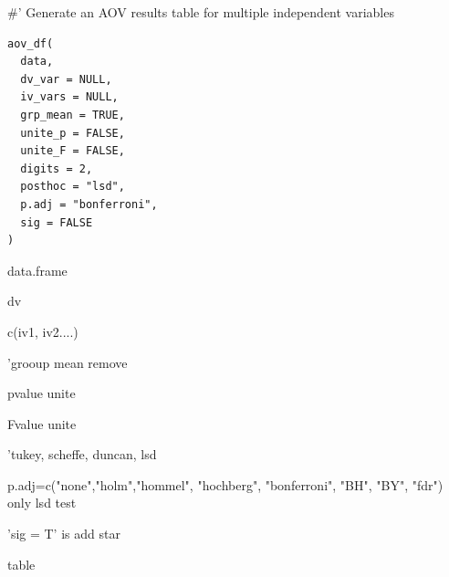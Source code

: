 \documentclass[a4paper]{book}
\begin{document}
%
\begin{Description}
\#' Generate an AOV results table for multiple independent variables
\end{Description}
%
\begin{Usage}
\begin{verbatim}
aov_df(
  data,
  dv_var = NULL,
  iv_vars = NULL,
  grp_mean = TRUE,
  unite_p = FALSE,
  unite_F = FALSE,
  digits = 2,
  posthoc = "lsd",
  p.adj = "bonferroni",
  sig = FALSE
)
\end{verbatim}
\end{Usage}
%
\begin{Arguments}
\begin{ldescription}
\item[\code{data}] data.frame

\item[\code{dv\_var}] dv

\item[\code{iv\_vars}] c(iv1, iv2....)

\item[\code{grp\_mean}] 'grooup mean remove

\item[\code{unite\_p}] pvalue unite

\item[\code{unite\_F}] Fvalue unite

\item[\code{posthoc}] 'tukey, scheffe, duncan, lsd

\item[\code{p.adj}] p.adj=c("none","holm","hommel", "hochberg", "bonferroni", "BH", "BY", "fdr") only lsd test

\item[\code{sig}] 'sig = T' is add star
\end{ldescription}
\end{Arguments}
%
\begin{Value}
table
\end{Value}
%
\end{document}

